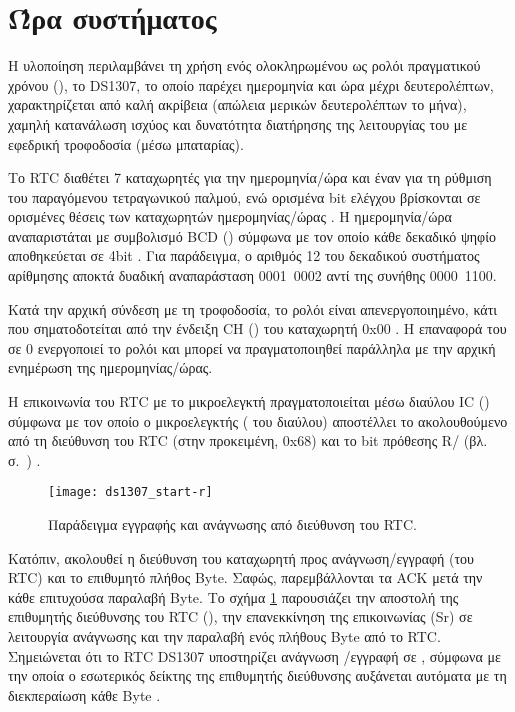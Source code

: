 \section{Ώρα συστήματος}
\label{sec:rtc}

Η υλοποίηση περιλαμβάνει τη χρήση ενός ολοκληρωμένου ως ρολόι πραγματικού χρόνου
(), το DS1307, το οποίο παρέχει ημερομηνία και ώρα
μέχρι δευτερολέπτων, χαρακτηρίζεται από καλή ακρίβεια (απώλεια μερικών
δευτερολέπτων το μήνα), χαμηλή κατανάλωση ισχύος και δυνατότητα διατήρησης της
λειτουργίας του με εφεδρική τροφοδοσία (μέσω μπαταρίας).

Το RTC διαθέτει 7 καταχωρητές για την ημερομηνία\slash{}ώρα και έναν για τη
ρύθμιση του παραγόμενου τετραγωνικού παλμού, ενώ ορισμένα bit ελέγχου βρίσκονται
σε ορισμένες θέσεις των καταχωρητών ημερομηνίας\slash{}ώρας
\parencite[8]{ds1307}. Η ημερομηνία\slash{}ώρα
αναπαριστάται με συμβολισμό BCD () σύμφωνα με
τον οποίο κάθε δεκαδικό ψηφίο αποθηκεύεται σε 4bit \parencite[8]{ds1307}.
Για παράδειγμα, ο αριθμός 12 του δεκαδικού συστήματος αρίθμησης αποκτά δυαδική
αναπαράσταση 0001~0002 αντί της συνήθης 0000~1100.

Κατά την αρχική σύνδεση με τη τροφοδοσία, το ρολόι είναι απενεργοποιημένο, κάτι
που σηματοδοτείται από την ένδειξη CH () του καταχωρητή 0x00
\parencite[8]{ds1307}. Η επαναφορά του σε 0 ενεργοποιεί το ρολόι και μπορεί να
πραγματοποιηθεί παράλληλα με την αρχική ενημέρωση της ημερομηνίας\slash{}ώρας.

Η επικοινωνία του RTC με το μικροελεγκτή πραγματοποιείται μέσω διαύλου
IC () σύμφωνα με τον οποίο ο μικροελεγκτής
( του διαύλου) αποστέλλει το  ακολουθούμενο από τη
διεύθυνση του RTC (στην προκειμένη, 0x68) και το bit πρόθεσης R\slash{}
(βλ.  σ.~\pageref{subsec:i2c}) \parencite[1,10]{ds1307}.

\begin{figure}
    \caption{Παράδειγμα εγγραφής και ανάγνωσης από διεύθυνση του RTC.
    \label{fig:rtc:start-r}}
    \begin{center}
    \texttt{[image: ds1307\_start-r]}
    \end{center}
\end{figure}

Κατόπιν, ακολουθεί η διεύθυνση του καταχωρητή προς ανάγνωση\slash{}εγγραφή (του
RTC) και το επιθυμητό πλήθος Byte. Σαφώς, παρεμβάλλονται τα  ACK μετά
την κάθε επιτυχούσα παραλαβή Byte. Το σχήμα \ref{fig:rtc:start-r} παρουσιάζει
την αποστολή της επιθυμητής διεύθυνσης του RTC (), την
επανεκκίνηση της επικοινωνίας (Sr) σε λειτουργία ανάγνωσης και την παραλαβή ενός
πλήθους Byte από το RTC. Σημειώνεται ότι το RTC DS1307 υποστηρίζει ανάγνωση%
\slash{}εγγραφή σε , σύμφωνα με την οποία ο εσωτερικός δείκτης
της επιθυμητής διεύθυνσης αυξάνεται αυτόματα με τη διεκπεραίωση κάθε Byte
\parencite[12]{ds1307}.


